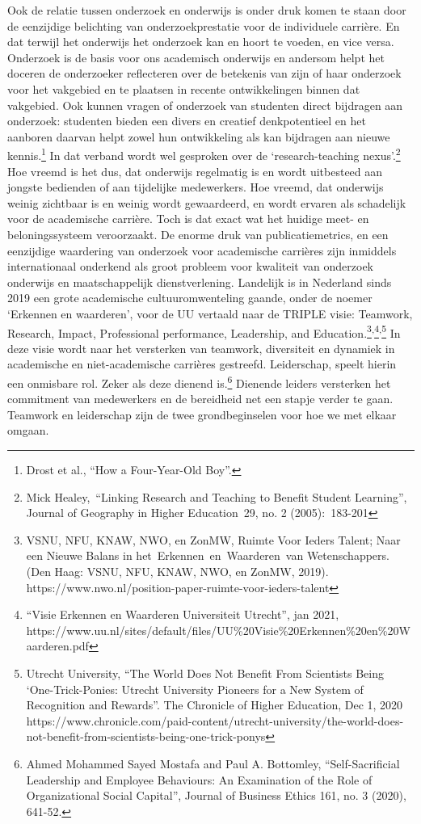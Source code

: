 \documentclass[empirical, authordate, ]{new-jote-article}
\begin{document}
	Ook de relatie tussen onderzoek en onderwijs is onder druk komen te staan door de eenzijdige belichting van onderzoekprestatie voor de individuele carrière. En dat terwijl het onderwijs het onderzoek kan en hoort te voeden, en vice versa. Onderzoek is de basis voor ons academisch onderwijs en andersom helpt het doceren de onderzoeker reflecteren over de betekenis van zijn of haar onderzoek voor het vakgebied en te plaatsen in recente ontwikkelingen binnen dat vakgebied. Ook kunnen vragen of onderzoek van studenten direct bijdragen aan onderzoek: studenten bieden een divers en creatief denkpotentieel en het aanboren daarvan helpt zowel hun ontwikkeling als kan bijdragen aan nieuwe kennis.\footnote{Drost et al., “How a Four-Year-Old Boy”.} In dat verband wordt wel gesproken over de ‘research-teaching nexus'.\footnote{Mick Healey, “Linking Research and Teaching to Benefit Student Learning”, Journal of Geography in Higher Education 29, no. 2 (2005): 183-201} Hoe vreemd is het dus, dat onderwijs regelmatig is en wordt uitbesteed aan jongste bedienden of aan tijdelijke medewerkers. Hoe vreemd, dat onderwijs weinig zichtbaar is en weinig wordt gewaardeerd, en wordt ervaren als schadelijk voor de academische carrière. Toch is dat exact wat het huidige meet- en beloningssysteem veroorzaakt. De enorme druk van publicatiemetrics, en een eenzijdige waardering van onderzoek voor academische carrières zijn inmiddels internationaal onderkend als groot probleem voor kwaliteit van onderzoek onderwijs en maatschappelijk dienstverlening. Landelijk is in Nederland sinds 2019 een grote academische cultuuromwenteling gaande, onder de noemer ‘Erkennen en waarderen', voor de UU vertaald naar de TRIPLE visie: Teamwork, Research, Impact, Professional performance, Leadership, and Education.\footnote{VSNU, NFU, KNAW, NWO, en ZonMW, Ruimte Voor Ieders Talent; Naar een Nieuwe Balans in het Erkennen en Waarderen van Wetenschappers. (Den Haag: VSNU, NFU, KNAW, NWO, en ZonMW, 2019). https://www.nwo.nl/position-paper-ruimte-voor-ieders-talent}\textsuperscript{,}\footnote{“Visie Erkennen en Waarderen Universiteit Utrecht”, jan 2021, https://www.uu.nl/sites/default/files/UU\%20Visie\%20Erkennen\%20en\%20Waarderen.pdf}\textsuperscript{,}\footnote{Utrecht University, “The World Does Not Benefit From Scientists Being ‘One-Trick-Ponies: Utrecht University Pioneers for a New System of Recognition and Rewards”. The Chronicle of Higher Education, Dec 1, 2020 https://www.chronicle.com/paid-content/utrecht-university/the-world-does-not-benefit-from-scientists-being-one-trick-ponys} In deze visie wordt naar het versterken van teamwork, diversiteit en dynamiek in academische en niet-academische carrières gestreefd. Leiderschap, speelt hierin een onmisbare rol. Zeker als deze dienend is.\footnote{Ahmed Mohammed Sayed Mostafa and Paul A. Bottomley, “Self-Sacrificial Leadership and Employee Behaviours: An Examination of the Role of Organizational Social Capital”, Journal of Business Ethics 161, no. 3 (2020), 641-52.} Dienende leiders versterken het commitment van medewerkers en de bereidheid net een stapje verder te gaan. Teamwork en leiderschap zijn de twee grondbeginselen voor hoe we met elkaar omgaan.
\end{document}
